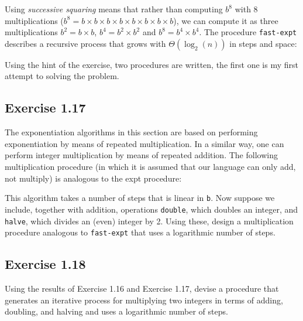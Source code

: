 \documentclass[letterpaper, leqno]{article}
\begin{document}
\textcolor{answer}{
Using \textit{successive squaring} means that rather than computing $b^8$ with 8 multiplications ($b^8=b\times b\times b\times b\times b\times b\times b\times b$), we can compute it as three multiplications $b^2=b\times b$, $b^4=b^2\times b^2$ and $b^8=b^4\times b^4$. The procedure \texttt{fast-expt} describes a recursive process that grows with $\Theta(\log_2(n))$ in steps and space:
}



\textcolor{answer}{
  Using the hint of the exercise, two procedures are written, the first one is my first attempt to solving the problem.
}



\subsection*{Exercise 1.17}
The exponentiation algorithms in this section are based on performing exponentiation by means of repeated multiplication. In a similar way, one can perform integer multiplication by means of repeated addition. The following multiplication procedure (in which it is assumed that our language can only add, not multiply) is analogous to the expt procedure:


This algorithm takes a number of steps that is linear in \texttt{b}. Now suppose we include, together with addition, operations \texttt{double}, which doubles an integer, and \texttt{halve}, which divides an (even) integer by 2. Using these, design a multiplication procedure analogous to \texttt{fast-expt} that uses a logarithmic number of steps.



\subsection*{Exercise 1.18}
Using the results of Exercise 1.16 and Exercise 1.17, devise a procedure that generates an iterative process for multiplying two integers in terms of adding, doubling, and halving and uses a logarithmic number of steps.

\end{document}
